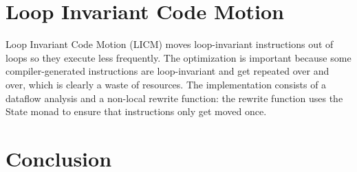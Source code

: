 \documentclass[11pt]{article}
\begin{document}

\section{Loop Invariant Code Motion}

Loop Invariant Code Motion (LICM) moves loop-invariant instructions
out of loops so they execute less frequently. The optimization is
important because some compiler-generated instructions are
loop-invariant and get repeated over and over, which is clearly a
waste of resources. The implementation consists of a dataflow analysis
and a non-local rewrite function: the rewrite function uses the State
monad to ensure that instructions only get moved once.

\section{Conclusion}
\end{document}
